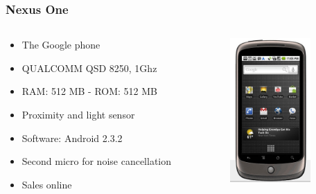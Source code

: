 \documentclass{beamer}
\begin{document}
\begin{frame}
\frametitle{Nexus One}

\begin{columns}
\begin{column}{0.5\textwidth}

\begin{itemize}

\item The Google phone
\item QUALCOMM QSD 8250, 1Ghz
\item RAM: 512 MB - ROM: 512 MB
\item Proximity and light sensor
\item Software: Android 2.3.2
\item Second micro for noise cancellation
\item Sales online
\end{itemize}
\end{column}

\begin{column}{0.5\textwidth}
\begin{center}
  \includegraphics[height=5.5cm]{figs/nexus-one}
\end{center}
\end{column}
\end{columns}
\end{frame}
\end{document}
